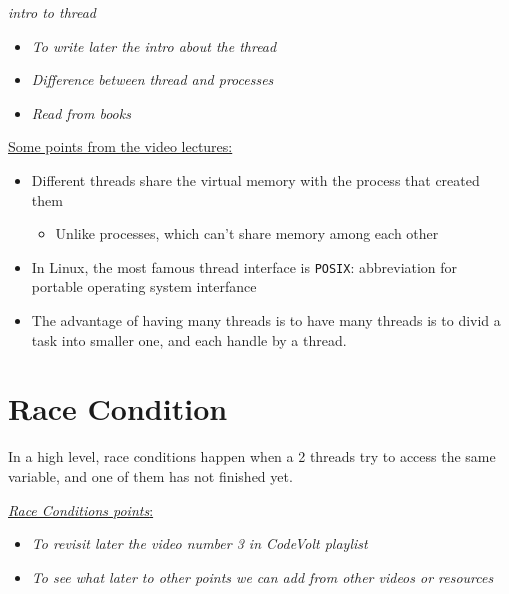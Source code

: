 \documentclass[12pt,a4paper]{book}
\begin{document}
 \textit{intro to thread}

\begin{itemize}

\item \textit{To write later the intro about the thread}


\item \textit{Difference between thread and processes}

\item \textit{Read from books}


\end{itemize}


\underline{Some points from the video lectures:}

\begin{itemize}

\item Different threads share the virtual memory with the process that created them

	\begin{itemize}
	\item Unlike processes, which can't share memory among 	each other
	\end{itemize}

\item In Linux, the most famous thread interface is \verb|POSIX|: abbreviation for portable operating system interfance

\item The advantage of having many threads is to have many threads is to divid a task into smaller one, and each handle by a thread.

\end{itemize}


\section{Race Condition}

In a high level, race conditions happen when a 2 threads try to access the same variable, and one of them has not finished yet.

 \underline{\textit{Race Conditions points}:} 


\begin{itemize}

\item \textit{To revisit later the video number 3 in CodeVolt playlist}

\item \textit{To see what later to other points we can add from other videos or resources}

\end{itemize}
\end{document}

